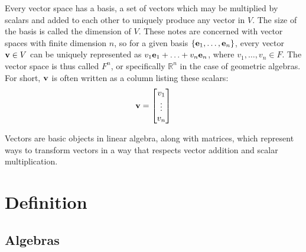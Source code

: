 \documentclass{article}
\begin{document}
Every vector space has a basis, a set of vectors
which may be multiplied by scalars and added to each other
to uniquely produce any vector in $V$.
The size of the basis is called the dimension of $V$.
These notes are concerned with vector spaces with finite dimension $n$,
so for a given basis $\{\vb{e}_1, \ldots, \vb{e}_n\}$,
every vector $\vb{v} \in V$ can be uniquely represented as  $v_1\vb{e}_1+\hdots+v_n\vb{e}_n$,
where $v_1, \ldots, v_n \in F$.
The vector space is thus called $F^n$,
or specifically $\mathbb{R}^n$ in the case of geometric algebras.
For short, $\vb{v}$ is often written as a column listing these scalars:
\[\vb{v} = \begin{bmatrix} v_1 \\ \vdots \\ v_n \end{bmatrix}\]

Vectors are basic objects in linear algebra, along with matrices,
which represent ways to transform vectors
in a way that respects vector addition and scalar multiplication.


\section{Definition}

\subsection{Algebras}
\end{document}
